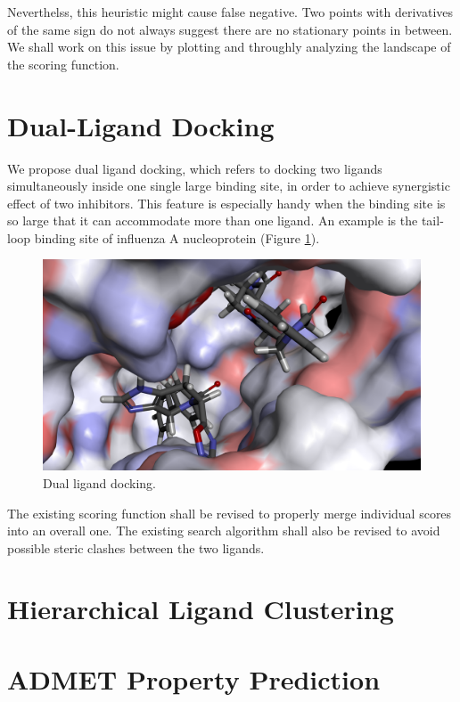 Neverthelss, this heuristic might cause false negative. Two points with derivatives of the same sign do not always suggest there are no stationary
points in between. We shall work on this issue by plotting and throughly analyzing the landscape of the scoring function.

\section{Dual-Ligand Docking}

We propose dual ligand docking, which refers to docking two ligands simultaneously inside one single large binding site, in order to achieve synergistic effect of two inhibitors. This feature is especially handy when the binding site is so large that it can accommodate more than one ligand. An example is the tail-loop binding site of influenza A nucleoprotein (Figure \ref{idock:2IQHDualLigands}).

\begin{figure}
\centering
\includegraphics[width=\textwidth]{idock/2IQHDualLigands.png}
\caption{Dual ligand docking.}
\label{idock:2IQHDualLigands}
\end{figure}

The existing scoring function shall be revised to properly merge individual scores into an overall one. The existing search algorithm shall also be revised to avoid possible steric clashes between the two ligands.

\section{Hierarchical Ligand Clustering}



\section{ADMET Property Prediction}

